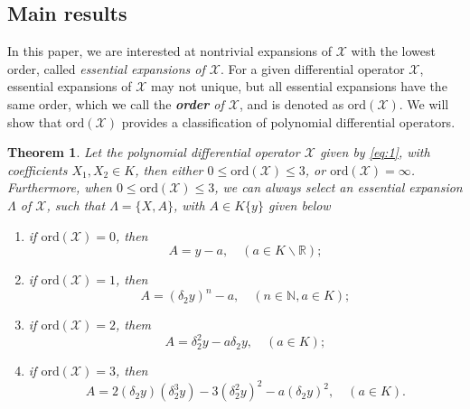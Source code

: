 \documentclass[preprint,12pt]{elsarticle}
\newtheorem{thm}{Theorem}
\begin{document}
\subsection{Main results}


In this paper, we are interested at nontrivial expansions of $\mathscr{X}$ with the lowest order, called \textit{essential expansions of $\mathscr{X}$}.  For a given differential operator $\mathscr{X}$, essential expansions of $\mathscr{X}$ may not unique, but all essential expansions have the same order, which we call the \textit{\textbf{order} of $\mathscr{X}$}, and is denoted as $\mathrm{ord}(\mathscr{X})$.  We will show that $\mathrm{ord}(\mathscr{X})$ provides a classification of polynomial differential operators. 


\begin{thm}
\label{th:1} Let the polynomial differential operator $\mathscr{X}$ given by \eqref{eq:1}, with coefficients $X_1,X_2\in K$,  then either
$0\leq \mathrm{ord}(\mathscr{X})\leq 3$, or $\mathrm{ord}(\mathscr{X}) = \infty$.
Furthermore, when $0\leq \mathrm{ord}(\mathscr{X})\leq 3$, we can always select an essential expansion $\Lambda$ of $\mathscr{X}$, such that $\Lambda = \{X, A\}$, with $A\in K\{y\}$ given below
\begin{enumerate}
\item[(1)] if $\mathrm{ord}(\mathscr{X}) = 0$, then
\begin{equation}
\label{eq:7}
A =  y - a,\quad (a\in K\backslash\mathbb{R});
\end{equation}
\item[(2)] if $\mathrm{ord}(\mathscr{X}) = 1$, then
\begin{equation}
\label{eq:8}
A=(\delta_2y)^n - a,\quad (n\in \mathbb{N}, a\in K);
\end{equation}
 \item[(3)] if $\mathrm{ord}(\mathscr{X})  = 2$, them
 \begin{equation}
 \label{eq:9}
A=\delta_2^2y - a \delta_2 y,\quad (a\in K);
 \end{equation}
\item[(4)] if $\mathrm{ord}(\mathscr{X}) = 3$, then
\begin{equation}
\label{eq:10}
A= 2 (\delta_2 y) (\delta_2^3 y) - 3 (\delta_2^2 y)^2 - a (\delta_2 y)^2,\quad (a\in K).
\end{equation}
\end{enumerate}
\end{thm}
\end{document}
